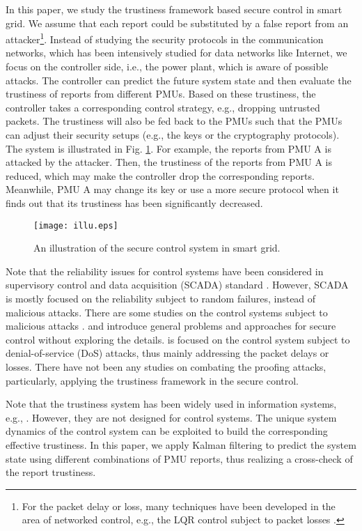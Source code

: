 \documentclass[journal,10pt,twocolumn]{IEEEtran}
\begin{document}
In this paper, we study the trustiness framework based secure control in smart grid. We assume that each report could be substituted by a false report from an attacker\footnote{For the packet delay or loss, many techniques have been developed in the area of networked control, e.g., the LQR control subject to packet losses \cite{Matveev2009}.}. Instead of studying the security protocols in the communication networks, which has been intensively studied for data networks like Internet, we focus on the controller side, i.e., the power plant, which is aware of possible attacks. The controller can predict the future system state and then evaluate the trustiness of reports from different PMUs. Based on these trustiness, the controller takes a corresponding control strategy, e.g., dropping untrusted packets. The trustiness will also be fed back to the PMUs such that the PMUs can adjust their security setups (e.g., the keys or the cryptography protocols). The system is illustrated in Fig. \ref{fig:illu}. For example, the reports from PMU A is attacked by the attacker. Then, the trustiness of the reports from PMU A is reduced, which may make the controller drop the corresponding reports. Meanwhile, PMU A may change its key or use a more secure protocol when it finds out that its trustiness has been significantly decreased.
\begin{figure}
  \centering
  \texttt{[image: illu.eps]}
  \caption{An illustration of the secure control system in smart grid.}\label{fig:illu}
\end{figure}

Note that the reliability issues for control systems have been considered in supervisory control and data acquisition (SCADA) standard \cite{SCADA2007}. However, SCADA is mostly focused on the reliability subject to random failures, instead of malicious attacks. There are some studies on the control systems subject to malicious attacks \cite{Amin2009}\cite{Cardenas2008_1}\cite{Cardenas2008_2}. \cite{Cardenas2008_1} and \cite{Cardenas2008_2} introduce general problems and approaches for secure control without exploring the details. \cite{Amin2009} is focused on the control system subject to denial-of-service (DoS) attacks, thus mainly addressing the packet delays or losses. There have not been any studies on combating the proofing attacks, particularly, applying the trustiness framework in the secure control.

Note that the trustiness system has been widely used in information systems, e.g., \cite{Josang2007}\cite{Stumpt2007}. However, they are not designed for control systems. The unique system dynamics of the control system can be exploited to build the corresponding effective trustiness. In this paper, we apply Kalman filtering \cite{Poor1994} to predict the system state using different combinations of PMU reports, thus realizing a cross-check of the report trustiness.
\end{document}
